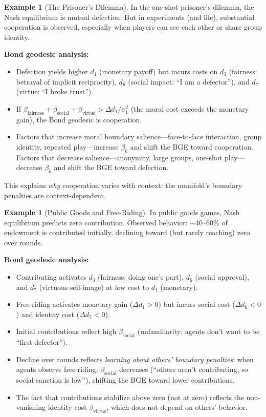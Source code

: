 \documentclass[12pt]{article}
\theoremstyle{definition}
\newtheorem{example}[theorem]{Example}
\theoremstyle{remark}
\begin{document}
\begin{example}[The Prisoner's Dilemma]
\label{ex:prisoners}
In the one-shot prisoner's dilemma, the Nash equilibrium is mutual defection.  But in experiments (and life), substantial cooperation is observed, especially when players can see each other or share group identity.

\textbf{Bond geodesic analysis:}
\begin{itemize}
    \item Defection yields higher $d_1$ (monetary payoff) but incurs costs on $d_3$ (fairness: betrayal of implicit reciprocity), $d_6$ (social impact: ``I am a defector''), and $d_7$ (virtue: ``I broke trust'').
    \item If $\beta_{\text{fairness}} + \beta_{\text{social}} + \beta_{\text{virtue}} > \Delta d_1 / \sigma_1^2$ (the moral cost exceeds the monetary gain), the Bond geodesic is cooperation.
    \item Factors that increase moral boundary salience---face-to-face interaction, group identity, repeated play---increase $\beta_k$ and shift the BGE toward cooperation.  Factors that decrease salience---anonymity, large groups, one-shot play---decrease $\beta_k$ and shift the BGE toward defection.
\end{itemize}
This explains \emph{why} cooperation varies with context: the manifold's boundary penalties are context-dependent.
\end{example}

\begin{example}[Public Goods and Free-Riding]
\label{ex:public_goods}
In public goods games, Nash equilibrium predicts zero contribution.  Observed behavior: $\sim$40--60\% of endowment is contributed initially, declining toward (but rarely reaching) zero over rounds.

\textbf{Bond geodesic analysis:}
\begin{itemize}
    \item Contributing activates $d_3$ (fairness: doing one's part), $d_6$ (social approval), and $d_7$ (virtuous self-image) at low cost to $d_1$ (monetary).
    \item Free-riding activates monetary gain ($\Delta d_1 > 0$) but incurs social cost ($\Delta d_6 < 0$) and identity cost ($\Delta d_7 < 0$).
    \item Initial contributions reflect high $\beta_{\text{social}}$ (unfamiliarity; agents don't want to be ``first defector'').
    \item Decline over rounds reflects \emph{learning about others' boundary penalties}: when agents observe free-riding, $\beta_{\text{social}}$ decreases (``others aren't contributing, so social sanction is low''), shifting the BGE toward lower contributions.
    \item The fact that contributions stabilize above zero (not at zero) reflects the non-vanishing identity cost $\beta_{\text{virtue}}$, which does not depend on others' behavior.
\end{itemize}
\end{example}
\end{document}
